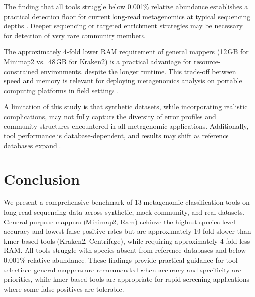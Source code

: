 \documentclass[11pt]{article}
\begin{document}
The finding that all tools struggle below 0.001\% relative abundance establishes a practical detection floor for current long-read metagenomics at typical sequencing depths \citep{quince2017shotgun}. Deeper sequencing or targeted enrichment strategies may be necessary for detection of very rare community members.

The approximately 4-fold lower RAM requirement of general mappers (12\,GB for Minimap2 vs.\ 48\,GB for Kraken2) is a practical advantage for resource-constrained environments, despite the longer runtime. This trade-off between speed and memory is relevant for deploying metagenomics analysis on portable computing platforms in field settings \citep{quick2016real}.

A limitation of this study is that synthetic datasets, while incorporating realistic complications, may not fully capture the diversity of error profiles and community structures encountered in all metagenomic applications. Additionally, tool performance is database-dependent, and results may shift as reference databases expand \citep{meyer2022critical}.

\section{Conclusion}

We present a comprehensive benchmark of 13 metagenomic classification tools on long-read sequencing data across synthetic, mock community, and real datasets. General-purpose mappers (Minimap2, Ram) achieve the highest species-level accuracy and lowest false positive rates but are approximately 10-fold slower than kmer-based tools (Kraken2, Centrifuge), while requiring approximately 4-fold less RAM. All tools struggle with species absent from reference databases and below 0.001\% relative abundance. These findings provide practical guidance for tool selection: general mappers are recommended when accuracy and specificity are priorities, while kmer-based tools are appropriate for rapid screening applications where some false positives are tolerable.



\end{document}
